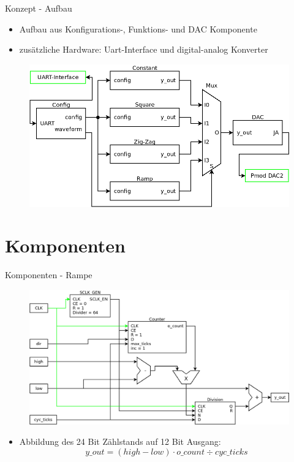 \documentclass[11pt]{beamer}
\begin{document}
\begin{frame}{Konzept - Aufbau}
  \begin{itemize}
    \item Aufbau aus Konfigurations-, Funktions- und DAC Komponente
    \item zusätzliche Hardware: Uart-Interface und digital-analog Konverter
  \end{itemize}

  \begin{figure}
    \includegraphics[scale=0.36]{fg_diagram_pres}
  \end{figure}
\end{frame}

\section{Komponenten}

\begin{frame}[t]{Komponenten - Rampe}
  \begin{figure}
    \includegraphics[scale=0.28]{ramp}
  \end{figure}
  \begin{itemize}
    \item Abbildung des 24 Bit Zählstands auf 12 Bit Ausgang:
    $$ y\_out = (high - low) \cdot o\_count \div cyc\_ticks $$
  \end{itemize}
\end{frame}
\end{document}

